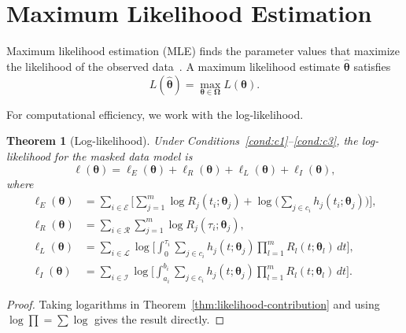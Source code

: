 \documentclass[11pt]{article}
\theoremstyle{definition}
\theoremstyle{plain}
\newtheorem{theorem}{Theorem}
\renewcommand{\v}[1]{\boldsymbol{#1}}
\newcommand{\btheta}{\v{\theta}}
\newcommand{\bomega}{\v{\Omega}}
\begin{document}
\section{Maximum Likelihood Estimation}
\label{sec:mle}

Maximum likelihood estimation (MLE) finds the parameter values that
maximize the likelihood of the observed
data~\citep{bain1992,casella2002statistical}.
A maximum likelihood estimate $\hat{\btheta}$ satisfies
\begin{equation}
\label{eq:mle-def}
    L(\hat{\btheta}) = \max_{\btheta \in \bomega} L(\btheta).
\end{equation}

For computational efficiency, we work with the log-likelihood.

\begin{theorem}[Log-likelihood]
\label{thm:log-likelihood}
Under Conditions~\ref{cond:c1}--\ref{cond:c3}, the log-likelihood for
the masked data model is
\begin{equation}
\label{eq:log-likelihood}
    \ell(\btheta) = \ell_E(\btheta) + \ell_R(\btheta)
    + \ell_L(\btheta) + \ell_I(\btheta),
\end{equation}
where
\begin{align}
\label{eq:log-likelihood-E}
    \ell_E(\btheta)
    &= \sum_{i \in \mathcal{E}} \biggl[
        \sum_{j=1}^m \log R_j(t_i; \v{\theta}_j)
        + \log\biggl(\sum_{j \in c_i} h_j(t_i; \v{\theta}_j)\biggr)
    \biggr], \\[6pt]
\label{eq:log-likelihood-R}
    \ell_R(\btheta)
    &= \sum_{i \in \mathcal{R}}
        \sum_{j=1}^m \log R_j(\tau_i; \v{\theta}_j), \\[6pt]
\label{eq:log-likelihood-L}
    \ell_L(\btheta)
    &= \sum_{i \in \mathcal{L}}
        \log\biggl[\int_0^{\tau_i}
        \sum_{j \in c_i} h_j(t; \v{\theta}_j)
        \prod_{l=1}^m R_l(t; \v{\theta}_l) \, dt\biggr], \\[6pt]
\label{eq:log-likelihood-I}
    \ell_I(\btheta)
    &= \sum_{i \in \mathcal{I}}
        \log\biggl[\int_{a_i}^{b_i}
        \sum_{j \in c_i} h_j(t; \v{\theta}_j)
        \prod_{l=1}^m R_l(t; \v{\theta}_l) \, dt\biggr].
\end{align}
\end{theorem}

\begin{proof}
Taking logarithms in Theorem~\ref{thm:likelihood-contribution} and
using $\log \prod = \sum \log$ gives the result directly.
\end{proof}
\end{document}
